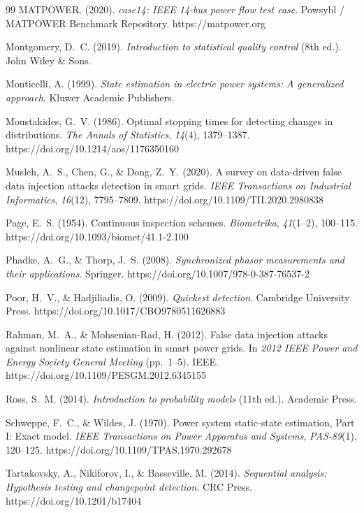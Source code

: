 \documentclass[11pt,a4paper]{report}
\begin{document}
\begin{thebibliography}{99}
MATPOWER. (2020). \textit{case14: IEEE 14-bus power flow test case}. Powsybl / MATPOWER Benchmark Repository. https://matpower.org

Montgomery, D.~C. (2019). \textit{Introduction to statistical quality control} (8th ed.). John Wiley \& Sons.

Monticelli, A. (1999). \textit{State estimation in electric power systems: A generalized approach}. Kluwer Academic Publishers.

Moustakides, G.~V. (1986). Optimal stopping times for detecting changes in distributions. \textit{The Annals of Statistics}, \textit{14}(4), 1379--1387. https://doi.org/10.1214/aos/1176350160

Musleh, A.~S., Chen, G., \& Dong, Z.~Y. (2020). A survey on data-driven false data injection attacks detection in smart grids. \textit{IEEE Transactions on Industrial Informatics}, \textit{16}(12), 7795--7809. https://doi.org/10.1109/TII.2020.2980838

Page, E.~S. (1954). Continuous inspection schemes. \textit{Biometrika}, \textit{41}(1--2), 100--115. https://doi.org/10.1093/biomet/41.1-2.100

Phadke, A.~G., \& Thorp, J.~S. (2008). \textit{Synchronized phasor measurements and their applications}. Springer. https://doi.org/10.1007/978-0-387-76537-2

Poor, H.~V., \& Hadjiliadis, O. (2009). \textit{Quickest detection}. Cambridge University Press. https://doi.org/10.1017/CBO9780511626883

Rahman, M.~A., \& Mohsenian-Rad, H. (2012). False data injection attacks against nonlinear state estimation in smart power grids. In \textit{2012 IEEE Power and Energy Society General Meeting} (pp.~1--5). IEEE. https://doi.org/10.1109/PESGM.2012.6345155

Ross, S.~M. (2014). \textit{Introduction to probability models} (11th ed.). Academic Press.

Schweppe, F.~C., \& Wildes, J. (1970). Power system static-state estimation, Part I: Exact model. \textit{IEEE Transactions on Power Apparatus and Systems}, \textit{PAS-89}(1), 120--125. https://doi.org/10.1109/TPAS.1970.292678

Tartakovsky, A., Nikiforov, I., \& Basseville, M. (2014). \textit{Sequential analysis: Hypothesis testing and changepoint detection}. CRC Press. https://doi.org/10.1201/b17404


\end{thebibliography}
\end{document}
